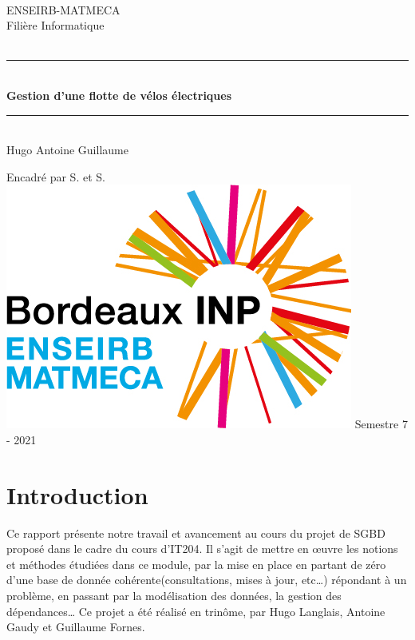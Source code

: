 \documentclass[10pt]{article}
\begin{document}
  \begin{titlepage}
    ~ \vfill
    \begin{center}
      \LARGE ENSEIRB-MATMECA\\ \LARGE Filière Informatique\\[1.5 cm]

      {\Large \bfseries {}}\\[0.5 cm]

      \rule{\linewidth}{0.5 mm}\\[0.4 cm] {\Huge \bfseries Gestion d'une flotte de vélos électriques\\[0.2 cm]} \rule{\linewidth}{0.5 mm}\\[1.5 cm] {\Large
      Hugo  \quad Antoine  \quad Guillaume  \\[0.5 cm]}

      {\large Encadré par S.  et S. }\\ \vfill
      \includegraphics[scale=0.4]{img/logo.em-bxinp} \vfill
      {\large Semestre 7 - 2021}
    \end{center}
  \end{titlepage}

  \tableofcontents
  \newpage

  \section{Introduction}\label{sec:intro}
  Ce rapport présente notre travail et avancement au cours du projet de SGBD proposé dans le cadre du cours d'IT204.
  Il s'agit de mettre en \oe uvre les notions et méthodes étudiées dans ce module, par la mise en place en partant de zéro d'une
  base de donnée cohérente(consultations, mises à jour, etc\dots) répondant à un problème, en passant par la modélisation
  des données, la gestion des dépendances\dots
  Ce projet a été réalisé en trinôme, par Hugo Langlais, Antoine Gaudy et Guillaume Fornes.\\
\end{document}
